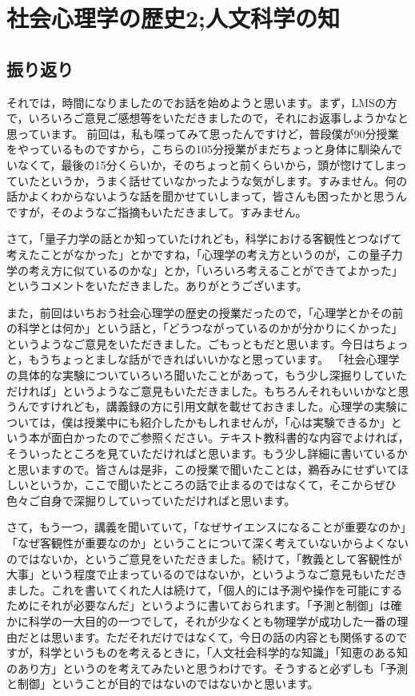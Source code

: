 \documentclass{ltjsbook}
\begin{document}
\setcounter{chapter}{2}
\chapter{社会心理学の歴史2;人文科学の知}
\label{sp03_humanities}
\section{振り返り}
それでは，時間になりましたのでお話を始めようと思います。まず，LMSの方で，いろいろご意見ご感想等をいただきましたので，それにお返事しようかなと思っています。
前回は，私も喋ってみて思ったんですけど，普段僕が90分授業をやっているものですから，こちらの105分授業がまだちょっと身体に馴染んでいなくて，最後の15分くらいか，そのちょっと前くらいから，頭が惚けてしまっていたというか，うまく話せていなかったような気がします。すみません。何の話かよくわからないような話を聞かせていしまって，皆さんも困ったかと思うんですが，そのようなご指摘もいただきまして。すみません。

さて，「量子力学の話とか知っていたけれども，科学における客観性とつなげて考えたことがなかった」とかですね，「心理学の考え方というのが，この量子力学の考え方に似ているのかな」とか，「いろいろ考えることができてよかった」というコメントをいただきました。ありがとうございます。

また，前回はいちおう社会心理学の歴史の授業だったので，「心理学とかその前の科学とは何か」という話と，「どうつながっているのかが分かりにくかった」というようなご意見をいただきました。ごもっともだと思います。今日はちょっと，もうちょっとましな話ができればいいかなと思っています。
「社会心理学の具体的な実験についていろいろ聞いたことがあって，もう少し深掘りしていただければ」というようなご意見もいただきました。もちろんそれもいいかなと思うんですけれども，講義録の方に引用文献を載せておきました。心理学の実験については，僕は授業中にも紹介したかもしれませんが，「心は実験できるか」という本\parencite{jikken2004}が面白かったのでご参照ください。テキスト教科書的な内容でよければ，そういったところを見ていただければと思います。もう少し詳細に書いているかと思いますので。皆さんは是非，この授業で聞いたことは，鵜呑みにせずいてほしいというか，ここで聞いたところの話で止まるのではなくて，そこからぜひ色々ご自身で深掘りしていっていただければと思います。

さて，もう一つ，講義を聞いていて，「なぜサイエンスになることが重要なのか」「なぜ客観性が重要なのか」ということについて深く考えていないからよくないのではないか，というご意見をいただきました。続けて，「教義として客観性が大事」という程度で止まっているのではないか，というようなご意見もいただきました。これを書いてくれた人は続けて，「個人的には予測や操作を可能にするためにそれが必要なんだ」というように書いておられます。「予測と制御」は確かに科学の一大目的の一つでして，それが少なくとも物理学が成功した一番の理由だとは思います。ただそれだけではなくて，今日の話の内容とも関係するのですが，科学というものを考えるときに，「人文社会科学的な知識」「知恵のある知のあり方」というのを考えてみたいと思うわけです。そうすると必ずしも「予測と制御」ということが目的ではないのではないかと思います。
\end{document}
